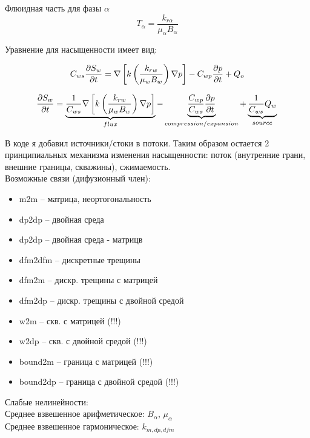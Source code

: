 \documentclass[14pt]{article}
\begin{document}
	Флюидная часть для фазы $\alpha$
	\begin{equation}
		T_{\alpha} = \frac{k_{r \alpha}}{\mu_{\alpha} B_{\alpha}} 
	\end{equation}
	
	Уравнение для насыщенности имеет вид:
	
	\begin{equation}
		C_{ws} \frac{\partial S_{w}}{\partial t} = 
		\nabla \left[ k \left( \frac{k_{rw}}{\mu_{w} B_{w}} \right) \nabla p \right] -
		C_{wp} \frac{\partial p}{\partial t} + 
		Q_{o} \\
	\end{equation}
	
	\begin{equation}
		\frac{\partial S_{w}}{\partial t} =  
		\underbrace{ \frac{1}{C_{ws}} 
		\nabla \left[ k \left( \frac{k_{rw}}{\mu_{w} B_{w}} \right) \nabla p \right] }_{flux} -
		\underbrace{ \frac{C_{wp}}{C_{ws}} \frac{\partial p}{\partial t} }_{compression/expansion} + 
		\underbrace{ \frac{1}{C_{ws}} Q_{w} }_{source} \\
	\end{equation}
	
	В коде я добавил источники/стоки в потоки. Таким образом остается 2 принципиальных механизма изменения насыщенности: поток (внутренние грани, внешние границы, скважины), сжимаемость.\\
	
	Возможные связи (дифузионный член):
	\begin{itemize}
		\item m2m -- матрица, неортогональность
		\item dp2dp -- двойная среда
		\item dp2dp -- двойная среда - матрицв
		\item dfm2dfm -- дискретные трещины
		\item dfm2m -- дискр. трещины с матрицей
		\item dfm2dp -- дискр. трещины с двойной средой

		\item w2m -- скв. с матрицей (!!!)
		\item w2dp -- скв. с двойной средой (!!!)
		
		\item bound2m -- граница с матрицей (!!!)
		\item bound2dp -- граница с двойной средой (!!!)
	\end{itemize}
	
	Слабые нелинейности: \\
	Среднее взвешенное арифметическое: $B_{\alpha}$, $\mu_{\alpha}$\\
	Среднее взвешенное гармоническое: $k_{m,dp,dfm}$
	
\end{document}
